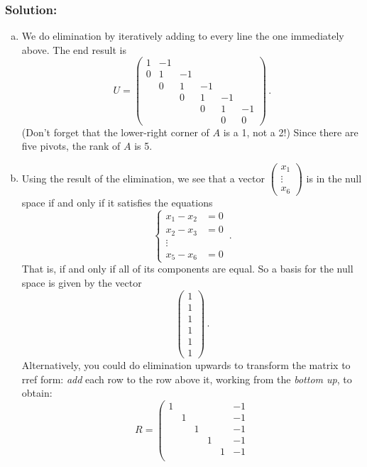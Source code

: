 \documentclass{article}
\begin{document}
\subsubsection*{Solution:}
\begin{enumerate}[(a)]
\item We do elimination by iteratively adding to every line the one immediately above. The end result is
\[
U = \left(\begin{array}{cccccc}
1 & -1\\
0 & 1 & -1\\
 & 0 & 1 & -1\\
 &  & 0 & 1 & -1\\
 &  &  & 0 & 1 & -1\\
 &  &  &  & 0 & 0
\end{array}\right)\,.
\]
(Don't forget that the lower-right corner of $A$ is a 1, not a 2!)  Since there are five pivots, the rank of $A$ is 5.
\item Using the result of the elimination, we see that a vector $\begin{pmatrix} x_1 \\ \vdots \\ x_6\end{pmatrix}$ is in the null space if and only if it satisfies the equations
\[\begin{cases} x_1-x_2 &=0\\ x_2-x_3&=0\\\vdots\\x_5-x_6&=0\end{cases}\,.\]
That is, if and only if all of its components are equal. So a basis for the null space is given by the vector
$$
\begin{pmatrix}1\\1\\1\\1\\1\\1\end{pmatrix}\,.
$$
  Alternatively, you could do elimination upwards to transform the matrix to rref form: \emph{add} each row to the row above it, working from the \emph{bottom up}, to obtain:
\[
R = \left(\begin{array}{cccccc}
1&   &   &  &   & -1\\
 & 1 &   &  &   & -1\\
 &   & 1 &  &   & -1\\
 &   &  & 1 &   & -1\\
 &   &  &   & 1 & -1\\

\end{array}\]
\end{enumerate}
\end{document}
